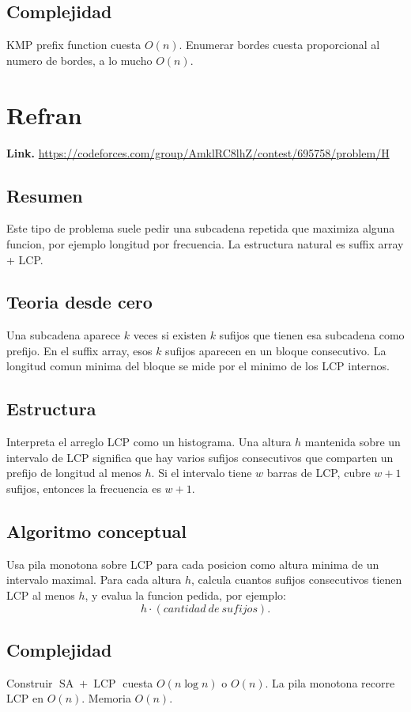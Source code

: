 \documentclass[10pt]{article}
\newcommand{\bigO}{O}
\newcommand{\SA}{\operatorname{SA}}
\newcommand{\LCP}{\operatorname{LCP}}
\begin{document}
\subsection*{Complejidad}
KMP prefix function cuesta $\bigO(n)$. Enumerar bordes cuesta proporcional al
numero de bordes, a lo mucho $\bigO(n)$.

\clearpage
\section{Refran}
\textbf{Link.} \url{https://codeforces.com/group/AmklRC8lhZ/contest/695758/problem/H}

\subsection*{Resumen}
Este tipo de problema suele pedir una subcadena repetida que maximiza alguna
funcion, por ejemplo longitud por frecuencia. La estructura natural es suffix
array + LCP.

\subsection*{Teoria desde cero}
Una subcadena aparece $k$ veces si existen $k$ sufijos que tienen esa subcadena
como prefijo. En el suffix array, esos $k$ sufijos aparecen en un bloque
consecutivo. La longitud comun minima del bloque se mide por el minimo de los
LCP internos.

\subsection*{Estructura}
Interpreta el arreglo LCP como un histograma. Una altura $h$ mantenida sobre un
intervalo de LCP significa que hay varios sufijos consecutivos que comparten un
prefijo de longitud al menos $h$. Si el intervalo tiene $w$ barras de LCP, cubre
$w+1$ sufijos, entonces la frecuencia es $w+1$.

\subsection*{Algoritmo conceptual}
Usa pila monotona sobre LCP para cada posicion como altura minima de un intervalo
maximal. Para cada altura $h$, calcula cuantos sufijos consecutivos tienen LCP
al menos $h$, y evalua la funcion pedida, por ejemplo:
\[
h \cdot (cantidad\ de\ sufijos).
\]

\subsection*{Complejidad}
Construir $\SA+\LCP$ cuesta $\bigO(n\log n)$ o $\bigO(n)$. La pila monotona
recorre LCP en $\bigO(n)$. Memoria $\bigO(n)$.
\end{document}
